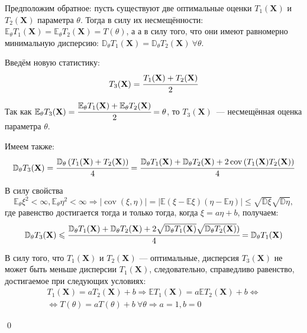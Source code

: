 \documentclass[oneside,final,14pt]{extreport}
\renewenvironment{proof}{{\bfseries Доказательство.}}{\qed}
\theoremstyle{plain}
\theoremstyle{definition}
\theoremstyle{named}
\begin{document}
\begin{proof}
Предположим обратное: пусть существуют две оптимальные оценки $T_1(\mathbf{X})$ и $T_2(\mathbf{X})$ параметра $\theta$. Тогда в силу их несмещённости: $\mathbb{E}_{\theta} T_{1}(\mathbf{X})=\mathbb{E}_{\theta} T_{2}(\mathbf{X})=T(\theta)$, а а в силу того, что они имеют равномерно минимальную дисперсию: $\mathbb{D}_{\theta} T_{1}(\mathbf{X})=\mathbb{D}_{\theta} T_{2}(\mathbf{X})~ \forall \theta$.

Введём новую статистику: 
\begin{equation}
    T_{3}(\mathbf{X})=\cfrac{T_{1}(\mathbf{X})+T_{2}(\mathbf{X})}{2}
\end{equation}

Так как $\mathbb{E}_{\theta} T_{3}(\mathbf{X})=\cfrac{\mathbb{E}_{\theta} T_{1}(\mathbf{X})+\mathbb{E}_{\theta} T_{2}(\mathbf{X})}{2}=\theta$, то $T_{3}(\mathbf{X})$~--- несмещённая оценка параметра $\theta$.

Имеем также:
\begin{equation*}
    \mathbb{D}_{\theta} T_{3}(\mathbf{X})=\cfrac{\mathbb{D}_{\theta}\left(T_{1}(\mathbf{X})+T_{2}(\mathbf{X})\right)}{4} =
    \cfrac{\mathbb{D}_{\theta} T_{1}(\mathbf{X})+\mathbb{D}_{\theta} T_{2}(\mathbf{X})+2 \operatorname{cov}\left(T_{1}(\mathbf{X}) T_{2}(\mathbf{X})\right)}{4}
\end{equation*}

В силу свойства
\begin{equation*}
    \mathbb{E}_{\theta} \xi^{2}<\infty, \mathbb{E}_{\theta} \eta^{2}<\infty \Rightarrow|\operatorname{cov}(\xi, \eta)| = | \mathbb{E}(\xi-\mathbb{E} \xi)(\eta-\mathbb{E} \eta)| \leqslant \sqrt{\mathbb{D} \xi} \sqrt{\mathbb{D} \eta},
\end{equation*}
где равенство достигается тогда и только тогда, когда $\xi=a \eta+b$, получаем:
\begin{equation*}
    \mathbb{D}_{\theta} T_{3}(\mathbf{X}) \leqslant \cfrac{\mathbb{D}_{\theta} T_{1}(\mathbf{X})+\mathbb{D}_{\theta} T_{2}(\mathbf{X})+2 \sqrt{\mathbb{D}_{\theta} T_{1}(\mathbf{X})} \sqrt{\mathbb{D}_{\theta} T_{2}(\mathbf{X})})}{4} =\mathbb{D}_{\theta} T_{1}(\mathbf{X})
\end{equation*}

В силу того, что $T_1(\mathbf{X})$ и $T_2(\mathbf{X})$ — оптимальные, дисперсия $T_3(\mathbf{X})$ не может быть меньше дисперсии $T_1(\mathbf{X})$, следовательно, справедливо равенство, достигаемое при следующих условиях:
\begin{equation*}
\begin{aligned}
    T_{1}(\mathbf{X})=a T_{2}(\mathbf{X})+b \Rightarrow \mathbb{E} T_{1}(\mathbf{X})
    = a \mathbb{E} T_{2}(\mathbf{X})+b 
    \Leftrightarrow \\
    \Leftrightarrow T(\theta) = a T(\theta)+b~ \forall \theta \Rightarrow a = 1, b = 0
\end{aligned}
\end{equation*}

\end{proof}
\end{document}
